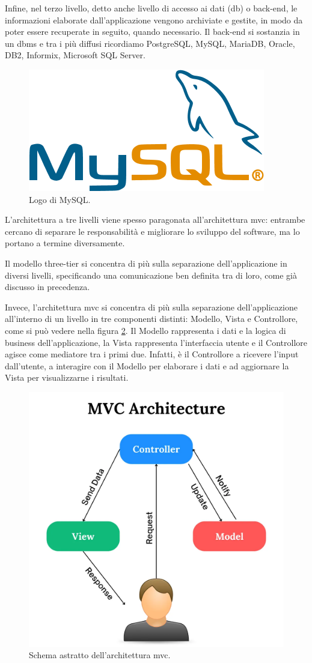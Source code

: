 Infine, nel terzo livello, detto anche livello di accesso ai dati (\acrlong{db}) o back-end, le informazioni elaborate dall'applicazione vengono archiviate e gestite, in modo da poter essere recuperate in seguito, quando necessario. Il back-end si sostanzia in un \acrfull{dbms} e tra i più diffusi ricordiamo PostgreSQL, MySQL, MariaDB, Oracle, DB2, Informix, Microsoft SQL Server.
\begin{figure}[H]
\centering
\includegraphics[width=.5\textwidth]{Images/Mysql_logo.png}
\caption{\label{fig:mysql}Logo di MySQL.}
\end{figure}

L'architettura a tre livelli viene spesso paragonata all'architettura \acrfull{mvc}:
entrambe cercano di separare le responsabilità e migliorare lo sviluppo del software, ma lo portano a termine diversamente. 

Il modello three-tier si concentra di più sulla separazione dell'applicazione in diversi livelli, specificando una comunicazione ben definita tra di loro, come già discusso in precedenza.

Invece, l'architettura \acrshort{mvc} si concentra di più sulla separazione dell'applicazione all'interno di un livello  in tre componenti distinti: Modello, Vista e Controllore, come si può vedere nella figura \ref{fig:mvc}. Il Modello rappresenta i dati e la logica di business dell'applicazione, la Vista rappresenta l'interfaccia utente e il Controllore agisce come mediatore tra i primi due. Infatti, è il Controllore a ricevere l'input dall'utente, a interagire con il Modello per elaborare i dati e ad aggiornare la Vista per visualizzarne i risultati.

\begin{figure}[H]
\centering
\includegraphics[width=.6\textwidth]{Images/mvc.png}
\caption{\label{fig:mvc}Schema astratto dell'architettura \acrshort{mvc}.}
\end{figure}


